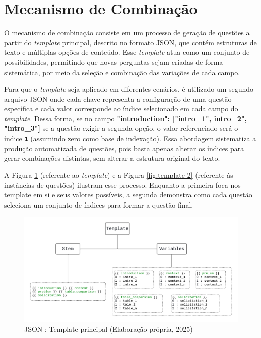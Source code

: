 \section{Mecanismo de Combinação}

O mecanismo de combinação consiste em um processo de geração de questões a partir do \textit{template} principal, descrito no formato JSON, que contém estruturas de texto e múltiplas opções de conteúdo. Esse \textit{template} atua como um conjunto de possibilidades, permitindo que novas perguntas sejam criadas de forma sistemática, por meio da seleção e combinação das variações de cada campo.

Para que o \textit{template} seja aplicado em diferentes cenários, é utilizado um segundo arquivo JSON onde cada chave representa a configuração de uma questão específica e cada valor corresponde ao índice selecionado em cada campo do \textit{template}. Dessa forma, se no campo \textbf{"introduction": ["intro\_1", intro\_2", "intro\_3"]} se a questão exigir a segunda opção, o valor referenciado será o índice \texttt{\textbf{1}} (assumindo zero como base de indexação). Essa abordagem sistematiza a produção automatizada de questões, pois basta apenas alterar os índices para gerar combinações distintas, sem alterar a estrutura original do texto.

A Figura \ref{fig:template-1} (referente ao \textit{template}) e a Figura \ref{fig:template-2} (referente às instâncias de questões) ilustram esse processo. Enquanto a primeira foca nos template em si e seus valores possíveis, a segunda demonstra como cada questão seleciona um conjunto de índices para formar a questão final. 

\begin{figure}[ht]
	\centering
	\includegraphics[width=16cm]{./imagens/capitulo5/template-1}
	\caption{JSON : Template principal (Elaboração própria, 2025) }
	\label{fig:template-1}
\end{figure}

